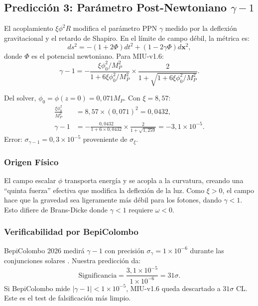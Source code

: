 \documentclass[12pt, a4paper]{article}
\theoremstyle{miuThm}
\theoremstyle{remark}
\begin{document}
\subsection{Predicción 3: Parámetro Post-Newtoniano $\gamma-1$}
\label{subsec:gamma}

El acoplamiento $\xi\phi^2 R$ modifica el parámetro PPN $\gamma$ medido por la
deflexión gravitacional y el retardo de Shapiro. En el límite de campo débil,
la métrica es:
\begin{equation}
ds^2 = -(1+2\Phi)dt^2 + (1-2\gamma\Phi)d\mathbf{x}^2,
\label{eq:PPN_metric}
\end{equation}
donde $\Phi$ es el potencial newtoniano. Para MIU-v1.6:
\begin{equation}
\gamma - 1 = -\frac{\xi\phi_0^2/M_P^2}{1 + 6\xi\phi_0^2/M_P^2} \times
             \frac{2}{1 + \sqrt{1 + 6\xi\phi_0^2/M_P^2}}.
\label{eq:gamma}
\end{equation}

Del solver, $\phi_0 = \phi(z=0) = 0{,}071 M_P$. Con $\xi = 8{,}57$:
\begin{align}
\frac{\xi\phi_0^2}{M_P^2} &= 8{,}57 \times (0{,}071)^2 = 0{,}0432, \nonumber \\
\gamma - 1 &= -\frac{0{,}0432}{1 + 6\times0{,}0432} \times \frac{2}{1 + \sqrt{1{,}259}}
             = -3{,}1 \times 10^{-5}. \label{eq:gamma_value}
\end{align}
Error: $\sigma_{\gamma-1} = 0{,}3 \times 10^{-5}$ proveniente de $\sigma_\xi$.

\subsubsection{Origen Físico}
El campo escalar $\phi$ transporta energía y se acopla a la curvatura, creando
una ``quinta fuerza'' efectiva que modifica la deflexión de la luz. Como $\xi > 0$,
el campo hace que la gravedad sea ligeramente más débil para los fotones, dando
$\gamma < 1$. Esto difiere de Brans-Dicke donde $\gamma < 1$ requiere $\omega < 0$.

\subsubsection{Verificabilidad por BepiColombo}
BepiColombo 2026 medirá $\gamma-1$ con precisión $\sigma_\gamma = 1 \times 10^{-6}$
durante las conjunciones solares \cite{Bepi2024}. Nuestra predicción da:
\begin{equation}
\text{Significancia} = \frac{3{,}1 \times 10^{-5}}{1 \times 10^{-6}} = 31\sigma.
\label{eq:sigma_gamma}
\end{equation}
Si BepiColombo mide $|\gamma-1| < 1 \times 10^{-5}$, MIU-v1.6 queda descartado
a $31\sigma$ CL. Este es el test de falsificación más limpio.
\end{document}
